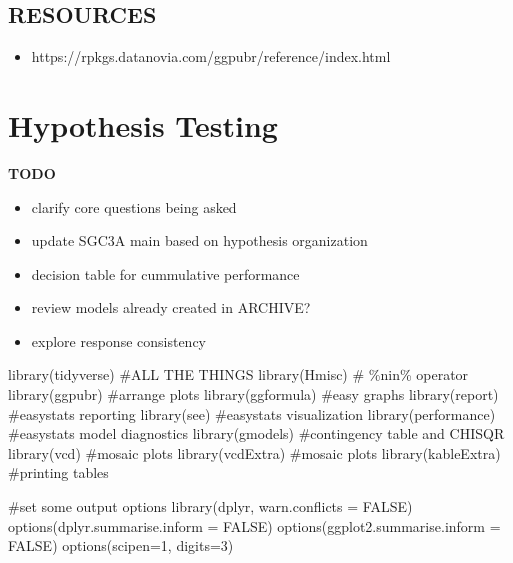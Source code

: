 \documentclass[
  letterpaper,
  DIV=11,
  numbers=noendperiod]{scrreprt}
\newenvironment{Shaded}{\begin{snugshade}}{\end{snugshade}}
\newcommand{\AttributeTok}[1]{\textcolor[rgb]{0.40,0.45,0.13}{#1}}
\newcommand{\CommentTok}[1]{\textcolor[rgb]{0.37,0.37,0.37}{#1}}
\newcommand{\ConstantTok}[1]{\textcolor[rgb]{0.56,0.35,0.01}{#1}}
\newcommand{\DecValTok}[1]{\textcolor[rgb]{0.68,0.00,0.00}{#1}}
\newcommand{\FunctionTok}[1]{\textcolor[rgb]{0.28,0.35,0.67}{#1}}
\newcommand{\NormalTok}[1]{\textcolor[rgb]{0.00,0.23,0.31}{#1}}
\providecommand{\tightlist}{%
  \setlength{\itemsep}{0pt}\setlength{\parskip}{0pt}}\usepackage{longtable,booktabs,array}
\begin{document}
\hypertarget{resources-2}{%
\section{RESOURCES}\label{resources-2}}

\begin{itemize}
\tightlist
\item
  https://rpkgs.datanovia.com/ggpubr/reference/index.html
\end{itemize}

\newpage

\hypertarget{sec-SGC3A-hypotesting}{%
\chapter{Hypothesis Testing}\label{sec-SGC3A-hypotesting}}

\textbf{TODO}\\

\begin{itemize}
\tightlist
\item
  clarify core questions being asked
\item
  update SGC3A main based on hypothesis organization
\item
  decision table for cummulative performance
\item
  review models already created in ARCHIVE?
\item
  explore response consistency
\end{itemize}

\begin{Shaded}
\begin{Highlighting}[]
\FunctionTok{library}\NormalTok{(tidyverse) }\CommentTok{\#ALL THE THINGS}
\FunctionTok{library}\NormalTok{(Hmisc) }\CommentTok{\# \%nin\% operator}
\FunctionTok{library}\NormalTok{(ggpubr) }\CommentTok{\#arrange plots}
\FunctionTok{library}\NormalTok{(ggformula) }\CommentTok{\#easy graphs}
\FunctionTok{library}\NormalTok{(report) }\CommentTok{\#easystats reporting}
\FunctionTok{library}\NormalTok{(see) }\CommentTok{\#easystats visualization}
\FunctionTok{library}\NormalTok{(performance) }\CommentTok{\#easystats model diagnostics}
\FunctionTok{library}\NormalTok{(gmodels) }\CommentTok{\#contingency table and CHISQR}
\FunctionTok{library}\NormalTok{(vcd) }\CommentTok{\#mosaic plots}
\FunctionTok{library}\NormalTok{(vcdExtra) }\CommentTok{\#mosaic plots}
\FunctionTok{library}\NormalTok{(kableExtra) }\CommentTok{\#printing tables }


\CommentTok{\#set some output options}
\FunctionTok{library}\NormalTok{(dplyr, }\AttributeTok{warn.conflicts =} \ConstantTok{FALSE}\NormalTok{)}
\FunctionTok{options}\NormalTok{(}\AttributeTok{dplyr.summarise.inform =} \ConstantTok{FALSE}\NormalTok{)}
\FunctionTok{options}\NormalTok{(}\AttributeTok{ggplot2.summarise.inform =} \ConstantTok{FALSE}\NormalTok{)}
\FunctionTok{options}\NormalTok{(}\AttributeTok{scipen=}\DecValTok{1}\NormalTok{, }\AttributeTok{digits=}\DecValTok{3}\NormalTok{)}
\end{Highlighting}
\end{Shaded}
\end{document}
